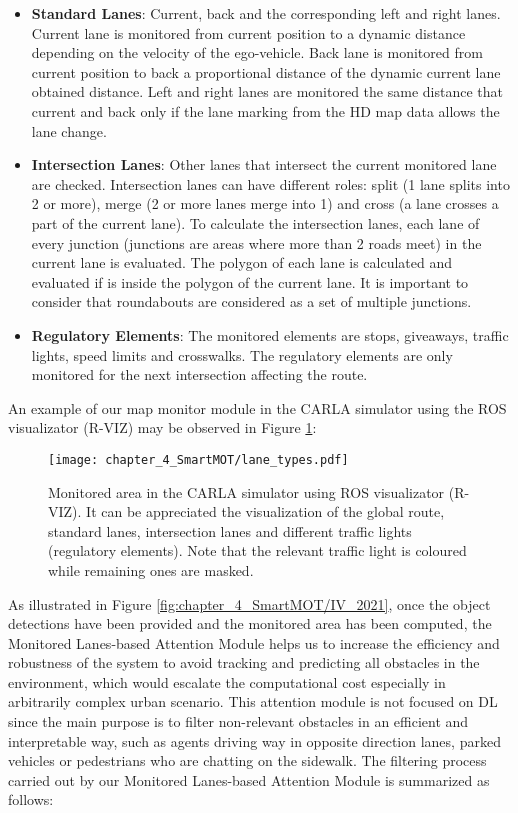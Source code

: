 \begin{itemize}
	\item \textbf{Standard Lanes}: Current, back and the corresponding left and right lanes. Current lane is monitored from current position to a dynamic distance depending on the velocity of the ego-vehicle. Back lane is monitored from current position to back a proportional distance of the dynamic current lane obtained distance. Left and right lanes are monitored the same distance that current and back only if the lane marking from the HD map data allows the lane change.
	\item \textbf{Intersection Lanes}: Other lanes that intersect the current monitored lane are checked. Intersection lanes can have different roles: split (1 lane splits into 2 or more), merge (2 or more lanes merge into 1) and cross (a lane crosses a part of the current lane). To calculate the intersection lanes, each lane of every junction (junctions are areas where more than 2 roads meet) in the current lane is evaluated. The polygon of each lane is calculated and evaluated if is inside the polygon of the current lane. It is important to consider that roundabouts are considered as a set of multiple junctions. 
	\item \textbf{Regulatory Elements}: The monitored elements are stops, giveaways, traffic lights, speed limits and crosswalks. The regulatory elements are only monitored for the next intersection affecting the route. 
\end{itemize}

An example of our map monitor module in the CARLA simulator \cite{dosovitskiy2017carla} using the ROS \cite{quigley2009ros} visualizator (R-VIZ) may be observed in Figure \ref{fig:chapter_4_SmartMOT/monitored_area_CARLA_ROS}:

\begin{figure}[!ht] 
	\centering
	\texttt{[image: chapter\_4\_SmartMOT/lane\_types.pdf]}
	\caption[Monitored area in the CARLA simulator using ROS visualizator (R-VIZ)]{Monitored area in the CARLA simulator using ROS visualizator (R-VIZ). It can be appreciated the visualization of the global route, standard lanes, intersection lanes and different traffic lights (regulatory elements). Note that the relevant traffic light is coloured while remaining ones are masked.}
	\label{fig:chapter_4_SmartMOT/monitored_area_CARLA_ROS}
\end{figure}

As illustrated in Figure \ref{fig:chapter_4_SmartMOT/IV_2021}, once the object detections have been provided and the monitored area has been computed, the Monitored Lanes-based Attention Module helps us to increase the efficiency and robustness of the system to avoid tracking and predicting all obstacles in the environment, which would escalate the computational cost especially in arbitrarily complex urban scenario. This attention module is not focused on \ac{DL} since the main purpose is to filter non-relevant obstacles in an efficient and interpretable way, such as agents driving way in opposite direction lanes, parked vehicles or pedestrians who are chatting on the sidewalk. The filtering process carried out by our Monitored Lanes-based Attention Module is summarized as follows:

